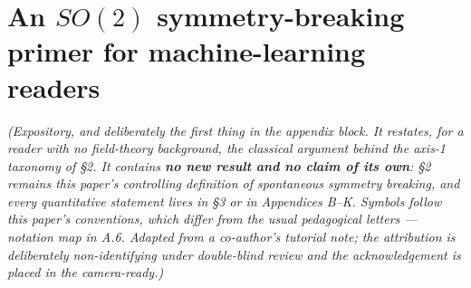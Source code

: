 \documentclass[10pt]{article}
\begin{document}
\section{An $SO(2)$ symmetry-breaking primer for machine-learning readers}

\emph{(Expository, and deliberately the first thing in the appendix block. It restates, for a reader with no field-theory background, the classical argument behind the axis-1 taxonomy of \S2. It contains \textbf{no new result and no claim of its own}: \S2 remains this paper's controlling definition of spontaneous symmetry breaking, and every quantitative statement lives in \S3 or in Appendices B--K. Symbols follow this paper's conventions, which differ from the usual pedagogical letters --- notation map in A.6. Adapted from a co-author's tutorial note; the attribution is deliberately non-identifying under double-blind review and the acknowledgement is placed in the camera-ready.)}
\end{document}
